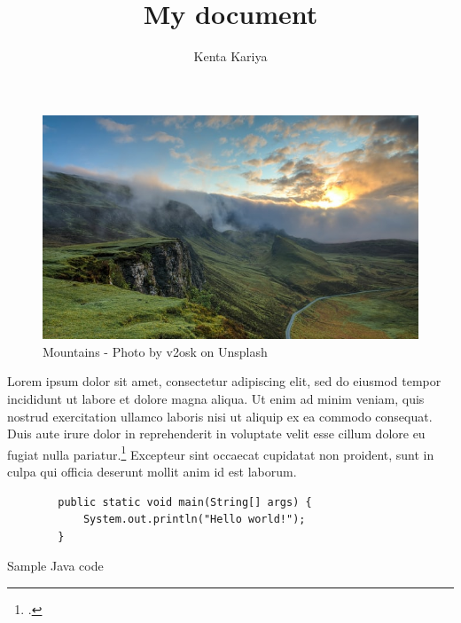 \documentclass[a4paper,12pt]{article}
\title{My document}
\author{Kenta Kariya}
\begin{document}
\blindtext

\begin{figure}[h]
    \includegraphics[width=\textwidth]{images/mountains}
    \centering
    \caption{Mountains - Photo by v2osk on Unsplash}
\end{figure}

Lorem ipsum dolor sit amet, consectetur adipiscing elit, sed do eiusmod tempor incididunt ut labore et dolore magna aliqua.
Ut enim ad minim veniam, quis nostrud exercitation ullamco laboris nisi ut aliquip ex ea commodo consequat.
Duis aute irure dolor in reprehenderit in voluptate velit esse cillum dolore eu fugiat nulla pariatur.\footcite{ref:mountain}
Excepteur sint occaecat cupidatat non proident, sunt in culpa qui officia deserunt mollit anim id est laborum.

\begin{listing}[H]
    \begin{verbatim}
        public static void main(String[] args) {
            System.out.println("Hello world!");
        }
    \end{verbatim}
    \caption{Sample Java code}
\end{listing}
\end{document}
